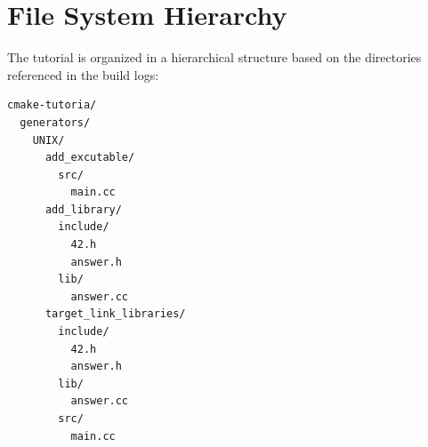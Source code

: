 \section{File System Hierarchy}
The tutorial is organized in a hierarchical structure based on the directories referenced in the build logs:

\begin{verbatim}
cmake-tutoria/
  generators/
    UNIX/
      add_excutable/
        src/
          main.cc
      add_library/
        include/
          42.h
          answer.h
        lib/
          answer.cc
      target_link_libraries/
        include/
          42.h
          answer.h
        lib/
          answer.cc
        src/
          main.cc
\end{verbatim}

